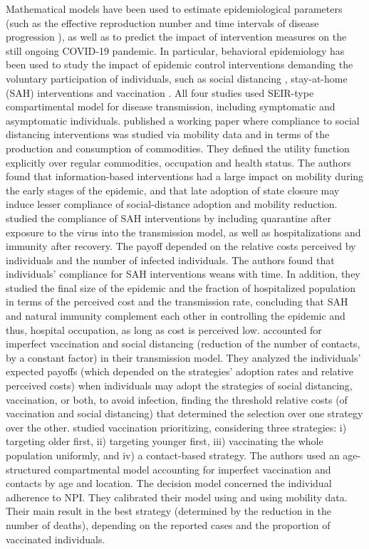 Mathematical models have been used to estimate epidemiological parameters (such as the effective reproduction number and time intervals of disease progression \cite[]{Xiang2021}), as well as to predict the impact of intervention measures \cite[]{Xiang2021} on the still ongoing COVID-19 pandemic. In particular, behavioral epidemiology has been used to study the impact of epidemic control interventions demanding the voluntary participation of individuals, such as social distancing \cite[]{Gupta2020}, stay-at-home (SAH) interventions \cite[]{Kabir2020} and vaccination \cite[]{Choi2020,Jentsch2020}. 
%
All four studies used SEIR-type compartimental model for disease transmission, including symptomatic and asymptomatic individuals. 
%
\cite{Gupta2020} published a working paper where compliance to social distancing interventions was studied via mobility data and in terms of the production and consumption of commodities. They defined the utility function explicitly over regular commodities, occupation and health status. The authors found that information-based interventions had a large impact on mobility during the early stages of the epidemic, and that late adoption of state closure may induce lesser compliance of social-distance adoption and mobility reduction.
%
\cite{Kabir2020} studied the compliance of SAH interventions by including quarantine after exposure to the virus into the transmission model, as well as hospitalizations and immunity after recovery. The payoff depended on the relative costs perceived by individuals and the number of infected individuals. The authors found that individuals' compliance for SAH interventions weans with time. In addition, they studied the final size of the epidemic and the fraction of hospitalized population in terms of the perceived cost and the transmission rate, concluding that SAH and natural immunity complement each other in controlling the epidemic and thus, hospital occupation, as long as cost is perceived low. 
%
\citet{Choi2020} accounted for imperfect vaccination and social distancing (reduction of the number of contacts, by a constant factor) in their transmission model. They analyzed the individuals' expected payoffs (which depended on the strategies' adoption rates and relative perceived costs) when individuals may adopt the strategies of social distancing, vaccination, or both, to avoid infection, finding the threshold relative costs (of vaccination and social distancing) that determined the selection over one strategy over the other. 
%
\cite{Jentsch2020} studied vaccination prioritizing, considering three strategies: i) targeting older first, ii) targeting younger first, iii) vaccinating the whole population uniformly, and iv) a contact-based strategy. The authors used an age-structured compartmental model accounting for imperfect vaccination and contacts by age and location. The decision model concerned the individual adherence to NPI. They calibrated their model using and using mobility data. Their main result in the best strategy (determined by the reduction in the number of deaths), depending on the reported cases and the proportion of vaccinated individuals.

